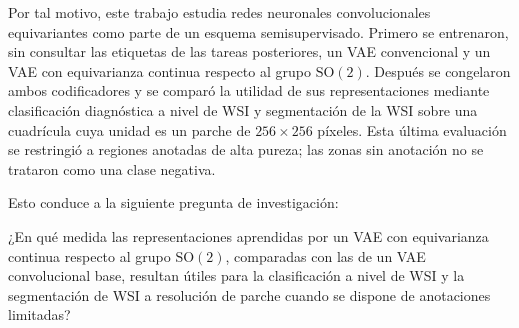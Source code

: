 Por tal motivo, este trabajo estudia redes neuronales convolucionales
equivariantes como parte de un esquema semisupervisado. Primero se entrenaron,
sin consultar las etiquetas de las tareas posteriores, un VAE convencional y un
VAE con equivarianza continua respecto al grupo \(\mathrm{SO}(2)\). Después se congelaron ambos
codificadores y se comparó la utilidad de sus representaciones mediante
clasificación diagnóstica a nivel de WSI y segmentación de la WSI sobre una
cuadrícula cuya unidad es un parche de \(256\times256\) píxeles. Esta última
evaluación se restringió a regiones anotadas de alta pureza; las zonas sin
anotación no se trataron como una clase negativa.

Esto conduce a la siguiente pregunta de investigación:

¿En qué medida las representaciones aprendidas por un VAE con equivarianza
continua respecto al grupo \(\mathrm{SO}(2)\), comparadas con las de un VAE convolucional base,
resultan útiles para la clasificación a nivel de WSI y la segmentación de WSI a
resolución de parche cuando se dispone de anotaciones limitadas?
